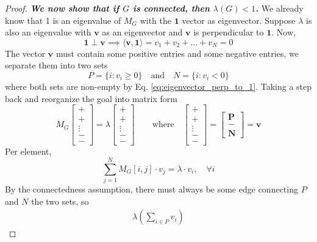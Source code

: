 \documentclass[11pt, letter]{book}
\newcommand{\bv}{\mathbf{v}}
\begin{document}
\begin{proof}
\textit{\textbf{We now show that if $G$ is connected, then $\lambda(G) < 1$.}} We already know that 1 is an eigenvalue of $M_G$ with the $\mathbf 1$ vector as eigenvector. Suppose $\lambda$ is also an eigenvalue with $\bv$ as an eigenvector and $\bv$ is perpendicular to $\mathbf 1$. Now, 
\begin{equation}
	\label{eq:eigenvector_perp_to_1}
	\mathbf 1 \perp \bv \implies \langle \bv, \mathbf 1 \rangle = v_1 + v_2 + \dots  + v_N  = 0
\end{equation}
The vector $\bv$ must contain some positive entries and some negative entries, we separate them into two sets
\begin{equation}
	P = \{ i : v_i \geq 0\} \quad \text{and} \quad N = \{ i : v_i < 0 \}
\end{equation}
where both sets are non-empty by Eq. \ref{eq:eigenvector_perp_to_1}. Taking a step back and reorganize the goal into matrix form
\begin{equation}
	M_G \begin{bmatrix}
		+ \\ + \\ \vdots \\ - \\ -
	\end{bmatrix} = \lambda \begin{bmatrix}
		+ \\ + \\ \vdots \\ - \\ -
	\end{bmatrix}\quad \quad \text{where} \quad \begin{bmatrix}
		+ \\ + \\ \vdots \\ - \\ - \end{bmatrix} = \begin{bmatrix}
			\mathbf P \\ - \\ \mathbf N
		\end{bmatrix} = \bv
\end{equation}
Per element, 
\begin{equation}
	\sum_{j = 1}^N M_G[i, j]\cdot v_j = \lambda \cdot v_i, \quad \forall i
\end{equation}
By the connectedness assumption, there must always be some edge connecting $P$ and $N$ the two sets, so
\begin{align}
	\lambda \left( \sum_{i \in P} v_i \right) 

\end{align}
\end{proof}
\end{document}
